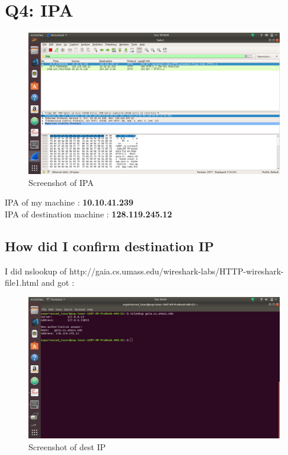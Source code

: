\documentclass{article}
\begin{document}
\section{Q4: IPA}
 \begin{figure}[H]
 \centering
 \includegraphics[width=1.0\textwidth]{../q4/a.png}
 \caption{\label{fig:PING}Screenshot of IPA}
 \end{figure}
 
IPA of my machine          : \textbf{10.10.41.239} \\
IPA of destination machine : \textbf{128.119.245.12}

\subsection{How did I confirm destination IP}
I did nslookup of http://gaia.cs.umass.edu/wireshark-labs/HTTP-wireshark-file1.html and got :
 \begin{figure}[H]
 \centering
 \includegraphics[width=1.0\textwidth]{../q4/b.png}
 \caption{\label{fig:PING}Screenshot of dest IP}
 \end{figure}
 
\end{document}
